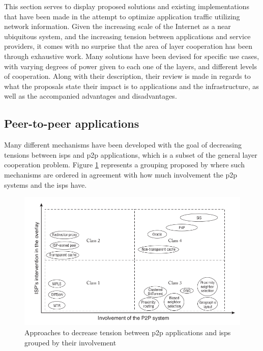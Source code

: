 \label{sec:state-solutions}

    This section serves to display proposed solutions and existing implementations that have been made in the attempt to optimize application traffic utilizing network information.
    Given the increasing scale of the Internet as a near ubiquitous system, and the increasing tension between applications and service providers, it comes with no surprise that the area of layer cooperation has been through exhaustive work.
    Many solutions have been devised for specific use cases, with varying degrees of power given to each one of the layers, and different levels of cooperation.
    Along with their description, their review is made in regards to what the proposals state their impact is to applications and the infrastructure, as well as the accompanied advantages and disadvantages.

\subsection{Peer-to-peer applications}

\label{ssec:approaches-p2p}

    Many different mechanisms have been developed with the goal of decreasing tensions between \glspl{isp} and \gls{p2p} applications, which is a subset of the general layer cooperation problem.
    Figure \ref{fig:p2p-isp-interactions} represents a grouping proposed by \cite{dan-Commag10} where such mechanisms are ordered in agreement with how much involvement the \gls{p2p} systems and the \glspl{isp} have. 

    \begin{figure}[H]
    \centering
    \includegraphics[scale=0.65]{img/approaches-isp-p2p.png}
    \caption{Approaches to decrease tension between \gls{p2p} applications and \glspl{isp} grouped by their involvement \cite{dan-Commag10}}
    \label{fig:p2p-isp-interactions}
    \end{figure}

